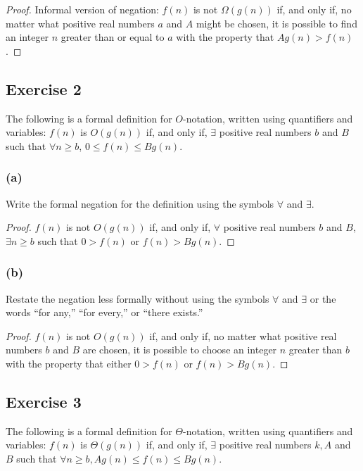 \documentclass[14pt]{extarticle}
\newcommand{\fa}{\forall}
\newcommand{\te}{\exists}
\begin{document}
\begin{proof}
Informal version of negation: \(f(n)\) is not \(\Omega(g(n))\) if, and only if, no matter what positive real numbers \(a\) 
and \(A\) might be chosen, it is possible to find an integer \(n\) greater than or equal to \(a\) with the property that 
\(Ag(n) > f(n)\).
\end{proof}

\subsection{Exercise 2}
The following is a formal definition for \(O\)-notation, written using quantifiers and variables: \(f(n)\) is 
\(O(g(n))\) if, and only if, \(\te\) positive real numbers \(b\) and \(B\) such that \(\fa n \geq b\), 
\(0 \leq f(n) \leq Bg(n)\).

\subsubsection{(a)}
Write the formal negation for the definition using the symbols \(\fa\) and \(\te\).

\begin{proof}
\(f(n)\) is not \(O(g(n))\) if, and only if, \(\fa\) positive real numbers \(b\) and \(B\), \(\te n \geq b\) such that 
\(0 > f(n)\) or \(f(n) > Bg(n)\).
\end{proof}

\subsubsection{(b)}
Restate the negation less formally without using the symbols \(\fa\) and \(\te\) or the words “for any,” “for every,” or 
“there exists.”

\begin{proof}
\(f(n)\) is not \(O(g(n))\) if, and only if, no matter what positive real numbers \(b\) and \(B\) are chosen, it is 
possible to choose an integer \(n\) greater than \(b\) with the property that either \(0 > f(n)\) or \(f(n) > Bg(n)\).
\end{proof}

\subsection{Exercise 3}
The following is a formal definition for \(\Theta\)-notation, written using quantifiers and variables: \(f(n)\) is \(\Theta 
(g(n))\) if, and only if, \(\te\) positive real numbers \(k, A\) and \(B\) such that \(\fa n \geq b, Ag(n) \leq f(n) \leq 
Bg(n)\).
\end{document}

